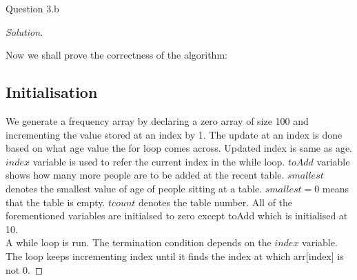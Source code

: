 \begin{solution}{Question 3.b}
\begin{proof}[Solution]
\begin{algorithm}[H]
\begin{algorithmic}[1]
                    \Else
                    \EndIf{}
                \EndWhile{}
                 
                \EndIf{}
                 
                \EndProcedure{}
            \end{algorithmic}
        \end{algorithm}
        
        Now we shall prove the correctness of the algorithm:
        \subsection*{Initialisation}
        We generate a frequency array by declaring a zero array of size 100 and incrementing the value stored at an index by 1. The update at an index is done based on what age value the for loop comes across. Updated index is same as age. \\
        $index$ variable is used to refer the current index in the while loop.
        $toAdd$ variable shows how many more people are to be added at the recent table.
        $smallest$ denotes the smallest value of age of people sitting at a table. $smallest=0$ means that the table is empty.
        $tcount$ denotes the table number.
        All of the forementioned variables are initialsed to zero except toAdd which is initialised at 10.\\
        A while loop is run. The termination condition depends on the $index$ variable.
        The loop keeps incrementing index until it finds the index at which arr[index] is not 0.

\end{proof}
\end{solution}
